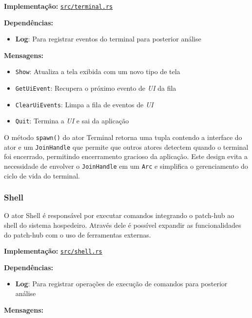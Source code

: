 \textbf{Implementação:} \href{https://github.com/nahharris/ph-actors-tcc/blob/master/src/terminal.rs}{\texttt{src/terminal.rs}}

\textbf{Dependências:}

\begin{itemize}
    \item \textbf{Log}: Para registrar eventos do terminal para posterior análise
\end{itemize}

\textbf{Mensagens:}

\begin{itemize}
    \item \texttt{Show}: Atualiza a tela exibida com um novo tipo de tela
    \item \texttt{GetUiEvent}: Recupera o próximo evento de \emph{UI} da fila
    \item \texttt{ClearUiEvents}: Limpa a fila de eventos de \emph{UI}
    \item \texttt{Quit}: Termina a \emph{UI} e sai da aplicação
\end{itemize}

O método \texttt{spawn()} do ator Terminal retorna uma tupla contendo a interface do ator e um \texttt{JoinHandle} que permite que outros atores detectem quando o terminal foi encerrado, permitindo encerramento gracioso da aplicação. Este design evita a necessidade de envolver o \texttt{JoinHandle} em um \texttt{Arc} e simplifica o gerenciamento do ciclo de vida do terminal.

\subsubsection{Shell}

O ator Shell é responsável por executar comandos integrando o patch-hub ao shell do sistema hospedeiro. Através dele é possível expandir as funcionalidades do patch-hub com o uso de ferramentas externas.

\textbf{Implementação:} \href{https://github.com/nahharris/ph-actors-tcc/blob/master/src/shell.rs}{\texttt{src/shell.rs}}

\textbf{Dependências:}

\begin{itemize}
    \item \textbf{Log}: Para registrar operações de execução de comandos para posterior análise
\end{itemize}

\textbf{Mensagens:}

